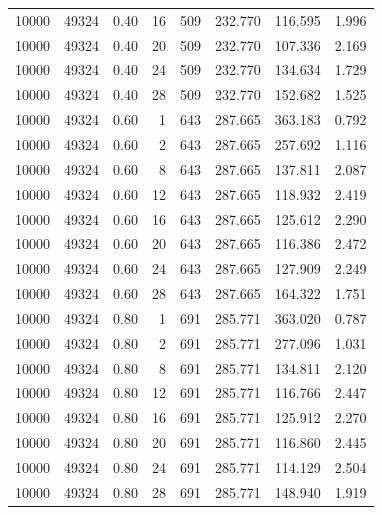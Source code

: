 \begin{longtable}{rrrrrrrr}
10000 & 49324 & 0.40 & 16 & 509 & 232.770 & 116.595 & 1.996 \\
10000 & 49324 & 0.40 & 20 & 509 & 232.770 & 107.336 & 2.169 \\
10000 & 49324 & 0.40 & 24 & 509 & 232.770 & 134.634 & 1.729 \\
10000 & 49324 & 0.40 & 28 & 509 & 232.770 & 152.682 & 1.525 \\
10000 & 49324 & 0.60 &  1 & 643 & 287.665 & 363.183 & 0.792 \\
10000 & 49324 & 0.60 &  2 & 643 & 287.665 & 257.692 & 1.116 \\
10000 & 49324 & 0.60 &  8 & 643 & 287.665 & 137.811 & 2.087 \\
10000 & 49324 & 0.60 & 12 & 643 & 287.665 & 118.932 & 2.419 \\
10000 & 49324 & 0.60 & 16 & 643 & 287.665 & 125.612 & 2.290 \\
10000 & 49324 & 0.60 & 20 & 643 & 287.665 & 116.386 & 2.472 \\
10000 & 49324 & 0.60 & 24 & 643 & 287.665 & 127.909 & 2.249 \\
10000 & 49324 & 0.60 & 28 & 643 & 287.665 & 164.322 & 1.751 \\
10000 & 49324 & 0.80 &  1 & 691 & 285.771 & 363.020 & 0.787 \\
10000 & 49324 & 0.80 &  2 & 691 & 285.771 & 277.096 & 1.031 \\
10000 & 49324 & 0.80 &  8 & 691 & 285.771 & 134.811 & 2.120 \\
10000 & 49324 & 0.80 & 12 & 691 & 285.771 & 116.766 & 2.447 \\
10000 & 49324 & 0.80 & 16 & 691 & 285.771 & 125.912 & 2.270 \\
10000 & 49324 & 0.80 & 20 & 691 & 285.771 & 116.860 & 2.445 \\
10000 & 49324 & 0.80 & 24 & 691 & 285.771 & 114.129 & 2.504 \\
10000 & 49324 & 0.80 & 28 & 691 & 285.771 & 148.940 & 1.919 \\
\end{longtable}

